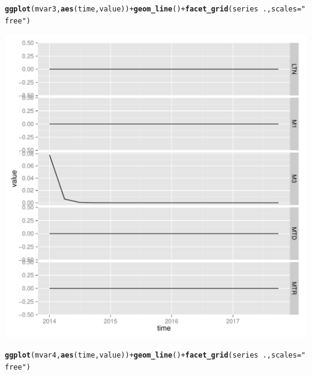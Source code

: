 \documentclass[11pt,oneside, a4paper]{amsart}\usepackage[]{graphicx}\usepackage[]{color}
\makeatletter
\def\maxwidth{ %
  \ifdim\Gin@nat@width>\linewidth
    \linewidth
  \else
    \Gin@nat@width
  \fi
}
\newcommand{\hlstr}[1]{\textcolor[rgb]{0.192,0.494,0.8}{#1}}%
\newcommand{\hlopt}[1]{\textcolor[rgb]{0,0,0}{#1}}%
\newcommand{\hlstd}[1]{\textcolor[rgb]{0.345,0.345,0.345}{#1}}%
\newcommand{\hlkwc}[1]{\textcolor[rgb]{0.333,0.667,0.333}{#1}}%
\newcommand{\hlkwd}[1]{\textcolor[rgb]{0.737,0.353,0.396}{\textbf{#1}}}%
\newenvironment{kframe}{%
 \def\at@end@of@kframe{}%
 \ifinner\ifhmode%
  \def\at@end@of@kframe{\end{minipage}}%
  \begin{minipage}{\columnwidth}%
 \fi\fi%
 \def\FrameCommand##1{\hskip\@totalleftmargin \hskip-\fboxsep
 \colorbox{shadecolor}{##1}\hskip-\fboxsep
     \hskip-\linewidth \hskip-\@totalleftmargin \hskip\columnwidth}%
 \MakeFramed {\advance\hsize-\width
   \@totalleftmargin\z@ \linewidth\hsize
   \@setminipage}}%
 {\par\unskip\endMakeFramed%
 \at@end@of@kframe}
\newenvironment{knitrout}{}{} %
\makeatother
\begin{document}
\begin{knitrout}
\begin{kframe}\begin{alltt}
\hlkwd{ggplot}\hlstd{(mvar3,} \hlkwd{aes}\hlstd{(time,value))} \hlopt{+} \hlkwd{geom_line}\hlstd{()} \hlopt{+} \hlkwd{facet_grid}\hlstd{(series} \hlopt{~} \hlstd{. ,}\hlkwc{scales}\hlstd{=}\hlstr{"free"}\hlstd{)}
\end{alltt}
\end{kframe}
\includegraphics[width=\maxwidth]{figure/unnamed-chunk-2-3} 
\begin{kframe}\begin{alltt}
\hlkwd{ggplot}\hlstd{(mvar4,} \hlkwd{aes}\hlstd{(time,value))} \hlopt{+} \hlkwd{geom_line}\hlstd{()} \hlopt{+} \hlkwd{facet_grid}\hlstd{(series} \hlopt{~} \hlstd{. ,}\hlkwc{scales}\hlstd{=}\hlstr{"free"}\hlstd{)}
\end{alltt}
\end{kframe}

\end{knitrout}
\end{document}
